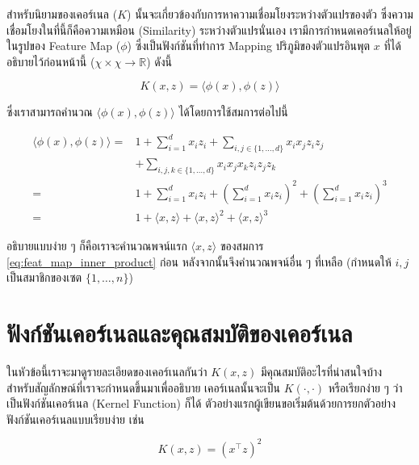สำหรับนิยามของเคอร์เนล ($K$) นั้นจะเกี่ยวข้องกับการหาความเชื่อมโยงระหว่างตัวแปรของตัว ซึ่งความเชื่อมโยงในที่นี้ก็คือความเหมือน (Similarity)
ระหว่างตัวแปรนั่นเอง เรามีการกำหนดเคอร์เนลให้อยู่ในรูปของ Feature Map ($\phi$) ซึ่งเป็นฟังก์ชันที่ทำการ Mapping ปริภูมิของตัวแปรอินพุต $x$
ที่ได้อธิบายไว้ก่อนหน้านี้ ($\chi \times \chi \rightarrow \mathbb{R}$) ดังนี้

\begin{equation}
    K(x,z) = \langle\phi(x),\phi(z)\rangle
\end{equation}

\noindent ซึ่งเราสามารถคำนวณ $\langle\phi(x),\phi(z)\rangle$ ได้โดยการใช้สมการต่อไปนี้

\begin{align}
    \langle\phi(x),\phi(z)\rangle =& 1 + \sum_{i=1}^d x_i z_i + \sum_{i,j\in\{1,\ldots,d\}} x_i x_j z_i z_j \\
    &+ \sum_{i,j,k \in \{1,\ldots,d\}} x_i x_j x_k z_i z_j z_k \nonumber \\
    =& 1 + \sum_{i=1}^d x_i z_i + \left(\sum_{i=1}^d x_i z_i \right)^2 + \left( \sum_{i=1}^d x_i z_i \right)^3 \\
    =& 1 + \langle x,z \rangle + \langle x,z \rangle^2 + \langle x,z \rangle^3\label{eq:feat_map_inner_product}
\end{align}

\noindent อธิบายแบบง่าย ๆ ก็คือเราจะคำนวณพจน์แรก $ \langle x,z \rangle$ ของสมการ \ref{eq:feat_map_inner_product} ก่อน 
หลังจากนั้นจึงคำนวณพจน์อื่น ๆ ที่เหลือ (กำหนดให้ $i,j$ เป็นสมาชิกของเซต $\{1, \dots, n\}$)

\section{ฟังก์ชันเคอร์เนลและคุณสมบัติของเคอร์เนล}
\label{sec:func_kernel}

ในหัวข้อนี้เราจะมาดูรายละเอียดของเคอร์เนลกันว่า $K(x,z)$ มีคุณสมบัติอะไรที่น่าสนใจบ้าง สำหรับสัญลักษณ์ที่เราจะกำหนดขึ้นมาเพื่ออธิบาย%
เคอร์เนลนั้นจะเป็น $K(\cdot,\cdot)$ หรือเรียกง่าย ๆ ว่าเป็นฟังก์ชันเคอร์เนล (Kernel Function) ก็ได้ 
ตัวอย่างแรกผู้เขียนขอเริ่มต้นด้วยการยกตัวอย่างฟังก์ชันเคอร์เนลแบบเรียบง่าย เช่น

\begin{equation}
    K(x,z) = (x^{\top} z)^{2}
\end{equation}

